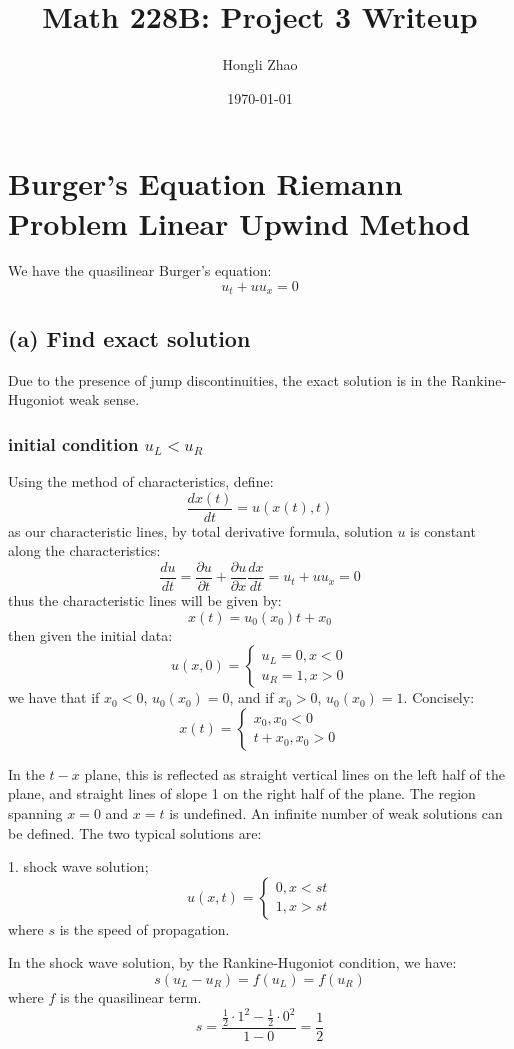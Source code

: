 \documentclass[12pt]{article} %
\author{Hongli Zhao}
\title{Math 228B: Project 3 Writeup}
\date{\today}
\newcommand{\pdx}[2]{\frac{\partial {#2}}{\partial {#1}}}
\begin{document}
\maketitle
\section{Burger's Equation Riemann Problem Linear Upwind Method}
We have the quasilinear Burger's equation:
$$
	u_t + uu_x = 0
$$

\subsection{(a) Find exact solution}
Due to the presence of jump discontinuities, the exact solution is in the Rankine-Hugoniot weak sense.
\subsubsection{initial condition $u_L < u_R$}
Using the method of characteristics, define:
$$
	\frac{dx(t)}{dt} = u(x(t),t)
$$ as our characteristic lines, by total derivative formula, solution $u$ is constant along the characteristics:
$$
	\frac{du}{dt} = \pdx{t}u + \pdx{x}u \frac{dx}{dt} = u_t + uu_x = 0
$$ thus the characteristic lines will be given by:
$$
	x(t) = u_0(x_0)t + x_0
$$ then given the initial data:
$$
	u(x,0) = \begin{cases}
		u_L = 0, x<0 \\
		u_R = 1, x>0
	\end{cases}
$$ we have that if $x_0 < 0$, $u_0(x_0) = 0$, and if $x_0 > 0$, $u_0(x_0) = 1$. Concisely:
$$
	x(t) = 
	\begin{cases}
		x_0, x_0 < 0 \\
		t + x_0, x_0 > 0
	\end{cases}
$$

In the $t-x$ plane, this is reflected as straight vertical lines on the left half of the plane, and straight lines of slope 1 on the right half of the plane. The region spanning $x = 0$ and $x = t$ is undefined. An infinite number of weak solutions can be defined. The two typical solutions are:

1. shock wave solution;
$$
	u(x,t) = 
	\begin{cases}
		0, x < st \\
		1, x>st
	\end{cases} 
$$ where $s$ is the speed of propagation.

In the shock wave solution, by the Rankine-Hugoniot condition, we have:
$$
	s(u_L - u_R) = f(u_L) = f(u_R)
$$ where $f$ is the quasilinear term.
$$
	s = \frac{\frac{1}{2}\cdot 1^2 - \frac12 \cdot 0^2}{1-0} = \frac12
$$
\end{document}
